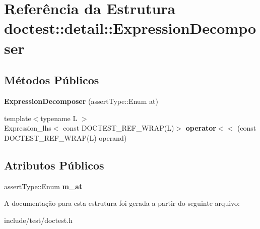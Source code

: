 \hypertarget{structdoctest_1_1detail_1_1ExpressionDecomposer}{}\section{Referência da Estrutura doctest\+:\+:detail\+:\+:Expression\+Decomposer}
\label{structdoctest_1_1detail_1_1ExpressionDecomposer}
\subsection*{Métodos Públicos}
\begin{DoxyCompactItemize}
\item 
\mbox{\label{structdoctest_1_1detail_1_1ExpressionDecomposer_a6bf2c46ebf0dc68106be801a90776e65}} 
{\bfseries Expression\+Decomposer} (assert\+Type\+::\+Enum at)
\item 
\mbox{\label{structdoctest_1_1detail_1_1ExpressionDecomposer_a509102ed073422b03848d32721678080}} 
{\footnotesize template$<$typename L $>$ }\\Expression\+\_\+lhs$<$ const D\+O\+C\+T\+E\+S\+T\+\_\+\+R\+E\+F\+\_\+\+W\+R\+AP(L)$>$ {\bfseries operator$<$$<$} (const D\+O\+C\+T\+E\+S\+T\+\_\+\+R\+E\+F\+\_\+\+W\+R\+AP(L) operand)
\end{DoxyCompactItemize}
\subsection*{Atributos Públicos}
\begin{DoxyCompactItemize}
\item 
\mbox{\label{structdoctest_1_1detail_1_1ExpressionDecomposer_a1a71b19bd41d2cbd1c8b4006412870c4}} 
assert\+Type\+::\+Enum {\bfseries m\+\_\+at}
\end{DoxyCompactItemize}


A documentação para esta estrutura foi gerada a partir do seguinte arquivo\+:\begin{DoxyCompactItemize}
\item 
include/test/doctest.\+h\end{DoxyCompactItemize}
